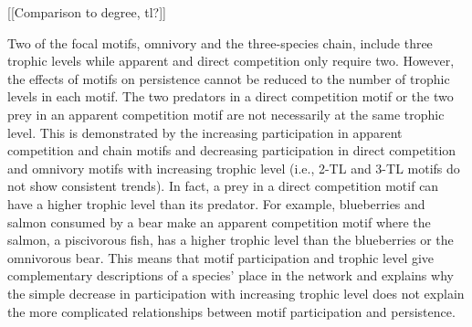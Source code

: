 \documentclass[12pt]{article}
\begin{document}
\begin{spacing}{2.0}
    
[[Comparison to degree, tl?]]

    Two of the focal motifs, omnivory and the three-species chain, include three trophic levels while apparent and direct competition only require two.
    However, the effects of motifs on persistence cannot be reduced to the number of trophic levels in each motif.
    The two predators in a direct competition motif or the two prey in an apparent competition motif are not necessarily at the same trophic level. This is demonstrated by the increasing participation in apparent competition and chain motifs and decreasing participation in direct competition and omnivory motifs with increasing trophic level (i.e., 2-TL and 3-TL motifs do not show consistent trends).
    In fact, a prey in a direct competition motif can have a higher trophic level than its predator.
    For example, blueberries and salmon consumed by a bear make an apparent competition motif where the salmon, a piscivorous fish, has a higher trophic level than the blueberries or the omnivorous bear.
    This means that motif participation and trophic level give complementary descriptions of a species' place in the network and explains why the simple decrease in participation with increasing trophic level does not explain the more complicated relationships between motif participation and persistence.
    

\end{spacing}
\end{document}
